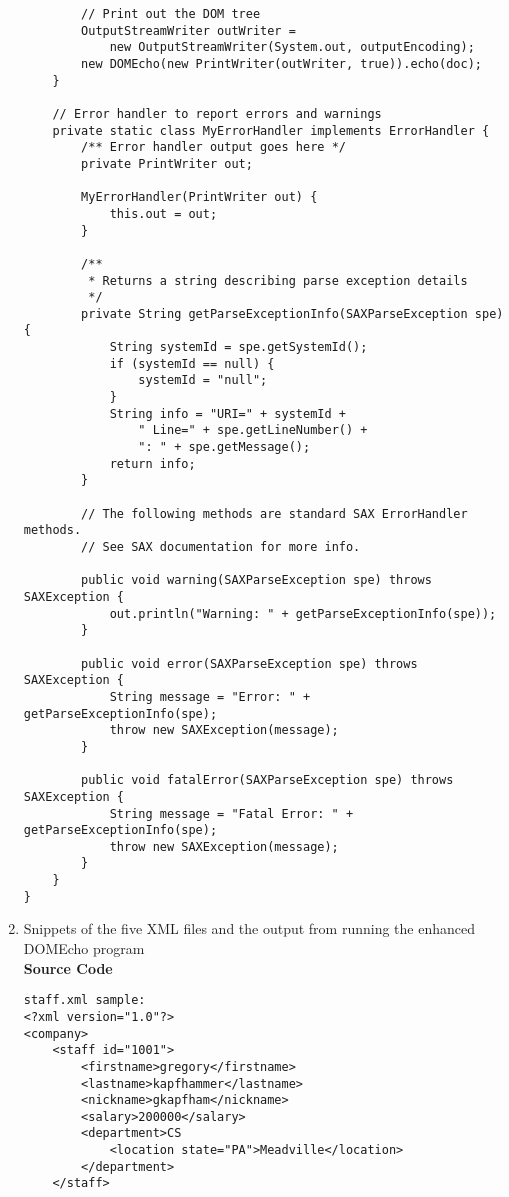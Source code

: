 \documentclass[11pt,english]{article}
\begin{document}
\begin{enumerate}
\begin{lstlisting}
        // Print out the DOM tree
        OutputStreamWriter outWriter =
            new OutputStreamWriter(System.out, outputEncoding);
        new DOMEcho(new PrintWriter(outWriter, true)).echo(doc);
    }

    // Error handler to report errors and warnings
    private static class MyErrorHandler implements ErrorHandler {
        /** Error handler output goes here */
        private PrintWriter out;

        MyErrorHandler(PrintWriter out) {
            this.out = out;
        }

        /**
         * Returns a string describing parse exception details
         */
        private String getParseExceptionInfo(SAXParseException spe) {
            String systemId = spe.getSystemId();
            if (systemId == null) {
                systemId = "null";
            }
            String info = "URI=" + systemId +
                " Line=" + spe.getLineNumber() +
                ": " + spe.getMessage();
            return info;
        }

        // The following methods are standard SAX ErrorHandler methods.
        // See SAX documentation for more info.

        public void warning(SAXParseException spe) throws SAXException {
            out.println("Warning: " + getParseExceptionInfo(spe));
        }

        public void error(SAXParseException spe) throws SAXException {
            String message = "Error: " + getParseExceptionInfo(spe);
            throw new SAXException(message);
        }

        public void fatalError(SAXParseException spe) throws SAXException {
            String message = "Fatal Error: " + getParseExceptionInfo(spe);
            throw new SAXException(message);
        }
    }
}

\end{lstlisting}
\item Snippets of the five XML files and the output from running the enhanced DOMEcho program
\\
\textbf{Source Code}
\begin{lstlisting}
staff.xml sample:
<?xml version="1.0"?>
<company>
    <staff id="1001">
        <firstname>gregory</firstname>
        <lastname>kapfhammer</lastname>
        <nickname>gkapfham</nickname>
        <salary>200000</salary>
        <department>CS
            <location state="PA">Meadville</location>
        </department>
    </staff>



\end{lstlisting}
\end{enumerate}
\end{document}
